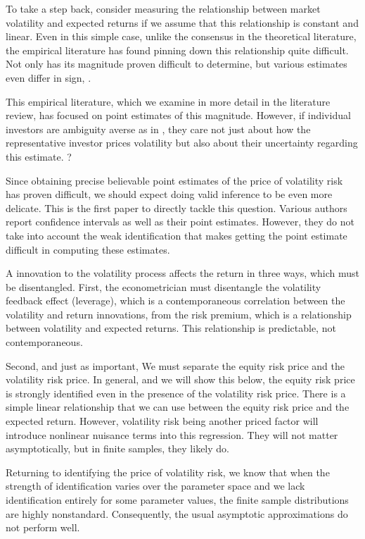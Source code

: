 \documentclass[11pt, letterpaper, twoside]{article}
\begin{document}
To take a step back, consider measuring the relationship between market volatility and expected returns if we assume that this relationship is constant and linear. Even in this simple case, unlike the consensus in the theoretical literature, the empirical literature has found pinning down this relationship quite difficult. Not only has its magnitude proven difficult to determine, but various estimates even differ in sign, \parencites{brandt2004relationship, lettau2010measuring}.  

This  empirical literature, which we examine in more detail in the literature review, has focused on point estimates of this magnitude. However, if individual investors are ambiguity averse as in \textcite{hansen2001robust, jiu2012ambiguity}, they care not just about how the representative investor prices volatility but also about their uncertainty regarding this estimate. ?

Since obtaining precise believable point estimates of the price of volatility risk has proven difficult, we should expect doing valid inference to be even more delicate. This is the first paper to directly tackle this question. Various authors report confidence intervals as well as their point estimates. However, they do not take into account the weak identification that makes getting the point estimate difficult in computing these estimates.  

A innovation to the volatility process affects the return in three ways, which must be disentangled. First, the econometrician must disentangle the volatility feedback effect (leverage), which is a contemporaneous correlation between the volatility and return innovations, from the risk premium, which is a relationship between volatility and expected returns. This relationship is predictable, not contemporaneous. 

Second, and just as important, We must separate the equity risk price and the volatility risk price. In general, and we will show this below, the equity risk price is strongly identified even in the presence of the volatility risk price. There is a simple linear relationship that we can use between the equity risk price and the expected return. However, volatility risk being another priced factor will introduce nonlinear nuisance terms into this regression. They will not matter asymptotically, but in finite samples, they likely do.

Returning to identifying the price of volatility risk, we know that when the strength of identification varies over the parameter space and we lack identification entirely for some parameter values, the finite sample distributions are highly nonstandard. Consequently, the usual asymptotic  approximations do not perform well. 
\end{document}
